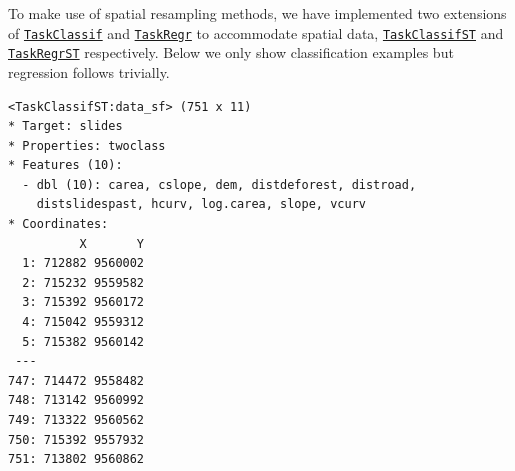 To make use of spatial resampling methods, we have implemented two
extensions of
\href{https://mlr3.mlr-org.com/reference/TaskClassif.html}{\texttt{TaskClassif}}
and
\href{https://mlr3.mlr-org.com/reference/TaskRegr.html}{\texttt{TaskRegr}}
to accommodate spatial data,
\href{https://mlr3spatiotempcv.mlr-org.com/reference/TaskClassifST.html}{\texttt{TaskClassifST}}
and
\href{https://mlr3spatiotempcv.mlr-org.com/reference/TaskRegrST.html}{\texttt{TaskRegrST}}
respectively. Below we only show classification examples but regression
follows trivially.

\begin{Shaded}
\begin{Highlighting}[]

\OtherTok{=}  \NormalTok{,}
   \NormalTok{, } \NormalTok{,}
   \NormalTok{(}\NormalTok{, }\NormalTok{), } \NormalTok{)}

\OtherTok{=}\SpecialCharTok{::} \NormalTok{(}\NormalTok{, }\NormalTok{), } \NormalTok{)}
\OtherTok{=}  \NormalTok{,}
   \NormalTok{)}
\end{Highlighting}
\end{Shaded}

\begin{verbatim}
<TaskClassifST:data_sf> (751 x 11)
* Target: slides
* Properties: twoclass
* Features (10):
  - dbl (10): carea, cslope, dem, distdeforest, distroad,
    distslidespast, hcurv, log.carea, slope, vcurv
* Coordinates:
          X       Y
  1: 712882 9560002
  2: 715232 9559582
  3: 715392 9560172
  4: 715042 9559312
  5: 715382 9560142
 ---               
747: 714472 9558482
748: 713142 9560992
749: 713322 9560562
750: 715392 9557932
751: 713802 9560862
\end{verbatim}

